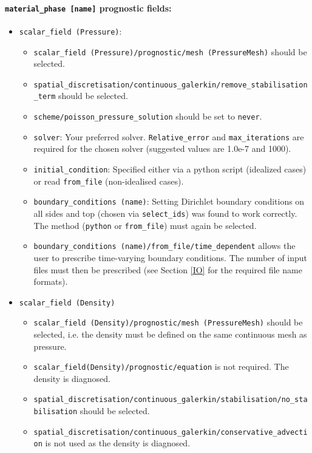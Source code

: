 \documentclass[10pt,a4paper]{article}
\begin{document}
\paragraph{\texttt{material\_phase [name]} prognostic fields:}
\begin{itemize}
\item \texttt{scalar\_field (Pressure)}:
\begin{itemize}
\item \texttt{scalar\_field (Pressure)/prognostic/mesh (PressureMesh)} should be selected.
\item \texttt{spatial\_discretisation/continuous\_galerkin/remove\_stabilisation\_term} should be selected.
\item \texttt{scheme/poisson\_pressure\_solution} should be set to \texttt{never}.
\item \texttt{solver}: Your preferred solver. \texttt{Relative\_error} and \texttt{max\_iterations} are required for the chosen solver (suggested values are 1.0e-7 and 1000).
\item \texttt{initial\_condition}: Specified either via a python script (idealized cases) or read \texttt{from\_file} (non-idealised cases).
\item \texttt{boundary\_conditions (name)}: Setting Dirichlet boundary conditions on all sides and top (chosen via \texttt{select\_ids}) was found to work correctly. The method (\texttt{python} or \texttt{from\_file}) must again be selected.
\item \texttt{boundary\_conditions (name)/from\_file/time\_dependent} allows the user to prescribe time-varying boundary conditions. The number of input files must then be prescribed (see Section \ref{IO} for the required file name formats).
\end{itemize}
\item \texttt{scalar\_field (Density)}
\begin{itemize}
\item \texttt{scalar\_field (Density)/prognostic/mesh (PressureMesh)} should be selected, i.e. the density must be defined on the same continuous mesh as pressure.
\item \texttt{scalar\_field(Density)/prognostic/equation} is not required. The density is diagnosed.
\item \texttt{spatial\_discretisation/continuous\_galerkin/stabilisation/no\_stabilisation} should be selected.
\item \texttt{spatial\_discretisation/continuous\_galerkin/conservative\_advection} is not used as the density is diagnosed.

\end{itemize}
\end{itemize}
\end{document}
